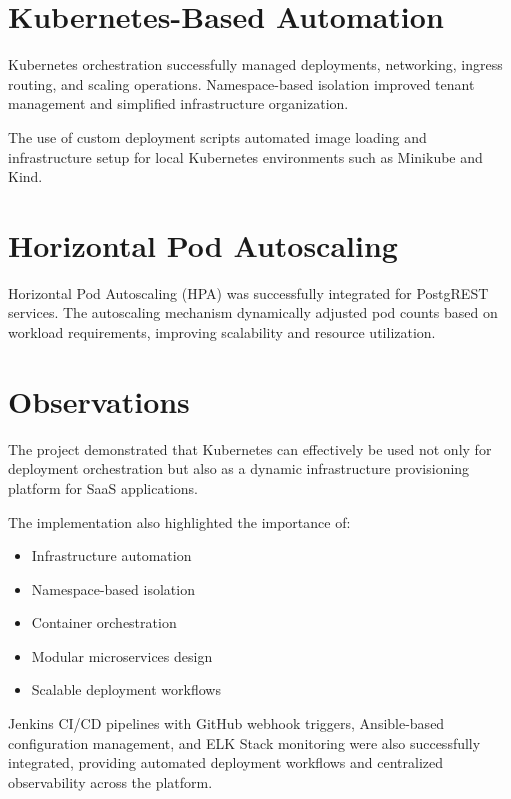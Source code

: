 \documentclass[12pt,a4paper]{report}
\begin{document}
\section{Kubernetes-Based Automation}

Kubernetes orchestration successfully managed deployments, networking, ingress routing, and scaling operations. Namespace-based isolation improved tenant management and simplified infrastructure organization.

The use of custom deployment scripts automated image loading and infrastructure setup for local Kubernetes environments such as Minikube and Kind.

\section{Horizontal Pod Autoscaling}

Horizontal Pod Autoscaling (HPA) was successfully integrated for PostgREST services. The autoscaling mechanism dynamically adjusted pod counts based on workload requirements, improving scalability and resource utilization.

\section{Observations}

The project demonstrated that Kubernetes can effectively be used not only for deployment orchestration but also as a dynamic infrastructure provisioning platform for SaaS applications.

The implementation also highlighted the importance of:

\begin{itemize}

    \item Infrastructure automation
    \item Namespace-based isolation
    \item Container orchestration
    \item Modular microservices design
    \item Scalable deployment workflows

\end{itemize}

Jenkins CI/CD pipelines with GitHub webhook triggers, Ansible-based configuration management, and ELK Stack monitoring were also successfully integrated, providing automated deployment workflows and centralized observability across the platform.
\end{document}
